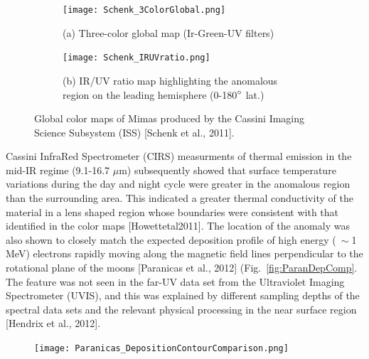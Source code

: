 \documentclass[11pt]{article} %
\begin{document}
	\begin{figure}[hb] \label{fig:Schenk}
	\centering
		\begin{subfigure}[h]{\textwidth}
			\texttt{[image: Schenk\_3ColorGlobal.png]}
			\caption{(a) Three-color global map (Ir-Green-UV filters) }
		\end{subfigure}
		\begin{subfigure}[h]{\textwidth}
			\texttt{[image: Schenk\_IRUVratio.png]}
			\caption{(b) IR/UV ratio map highlighting the anomalous region on the leading hemisphere (0-180$\degree$ lat.)}
		\end{subfigure}
	\caption{Global color maps of Mimas produced by the Cassini Imaging Science Subsystem (ISS) [Schenk et al., 2011].}
	\end{figure}

	Cassini InfraRed Spectrometer (CIRS) measurments of thermal emission in the mid-IR regime (9.1-16.7 $\mu$m) subsequently showed that surface temperature variations during the day and night cycle were greater in the anomalous region than the surrounding area. This indicated a greater thermal conductivity of the material in a lens shaped region whose boundaries were consistent with that identified in the color maps [Howettetal2011]. The location of the anomaly was also shown to closely match the expected deposition profile of high energy ($\>\sim$1 MeV) electrons rapidly moving along the magnetic field lines perpendicular to the rotational plane of the moons [Paranicas et al., 2012] (Fig.~\ref{fig:ParanDepComp}. The feature was not seen in the far-UV data set from the Ultraviolet Imaging Spectrometer (UVIS), and this was explained by different sampling depths of the spectral data sets and the relevant physical processing in the near surface region [Hendrix et al., 2012].
	
	\begin{figure}[ht] \label{fig:ParanDepCom}
	\centering
		\texttt{[image: Paranicas\_DepositionContourComparison.png]}
	\caption{}
	\end{figure}
\end{document}
